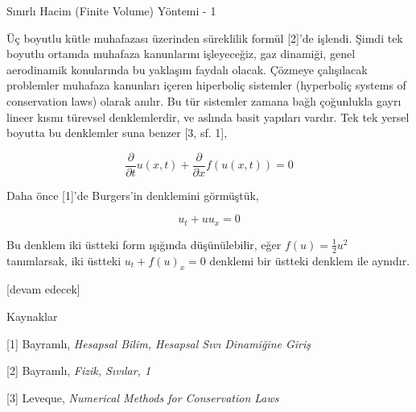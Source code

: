 \documentclass[12pt,fleqn]{article}\usepackage{../../common}
\begin{document}
Sınırlı Hacim (Finite Volume) Yöntemi - 1

Üç boyutlu kütle muhafazası üzerinden süreklilik formül [2]'de işlendi.  Şimdi
tek boyutlu ortamda muhafaza kanunlarını işleyeceğiz, gaz dinamiği, genel
aerodinamik konularında bu yaklaşım faydalı olacak. Çözmeye çalışılacak
problemler muhafaza kanunları içeren hiperboliç sistemler (hyperboliç systems of
conservation laws) olarak anılır. Bu tür sistemler zamana bağlı çoğunlukla gayrı
lineer kısmı türevsel denklemlerdir, ve aslında basit yapıları vardır. Tek tek
yersel boyutta bu denklemler suna benzer [3, sf. 1],

$$
\frac{\partial }{\partial t} u(x,t) + 
\frac{\partial }{\partial x} f(u(x,t)) = 0
$$

Daha önce [1]'de Burgers'in denklemini görmüştük, 

$$
u_t + uu_x = 0
$$

Bu denklem iki üstteki form ışığında düşünülebilir, eğer $f(u) = \frac{1}{2}u^2$
tanımlarsak, iki üstteki $u_t + f(u)_x = 0$ denklemi bir üstteki denklem ile
aynıdır.



[devam edecek]

Kaynaklar

[1] Bayramlı, {\em Hesapsal Bilim, Hesapsal Sıvı Dinamiğine Giriş}

[2] Bayramlı, {\em Fizik, Sıvılar, 1}

[3] Leveque, {\em Numerical Methods for Conservation Laws}
\end{document}
